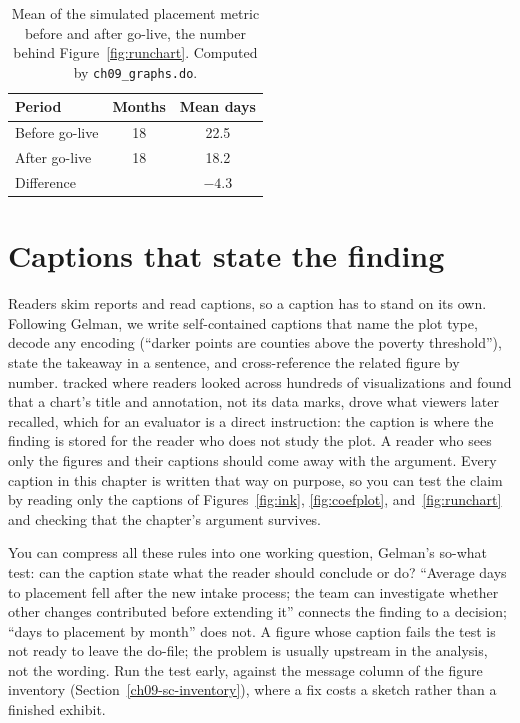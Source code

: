 \documentclass[
    a4paper,
    fontsize=10pt,
    twoside=true,
    numbers=noenddot,
]{kaobook}
\begin{document}
\begin{table}[htbp]
\centering
\caption[Before and after the intervention]{Mean of the simulated placement metric before and after go-live, the number behind Figure~\ref{fig:runchart}. Computed by \texttt{ch09\_graphs.do}.}
\label{tab:runsummary}
\begin{tabular}{lcc}
\hline
Period & Months & Mean days \\
\hline
Before go-live & 18 & 22.5 \\
After go-live  & 18 & 18.2 \\
\hline
Difference     &    & $-4.3$ \\
\hline
\end{tabular}
\end{table}

\section{Captions that state the finding}\label{sec:captions}
Readers skim reports and read captions, so a caption has to stand on its own. Following Gelman, we write self-contained captions that name the plot type, decode any encoding (\enquote{darker points are counties above the poverty threshold}), state the takeaway in a sentence, and cross-reference the related figure by number. \textcite{borkin2016beyond} tracked where readers looked across hundreds of visualizations and found that a chart's title and annotation, not its data marks, drove what viewers later recalled, which for an evaluator is a direct instruction: the caption is where the finding is stored for the reader who does not study the plot. A reader who sees only the figures and their captions should come away with the argument. Every caption in this chapter is written that way on purpose, so you can test the claim by reading only the captions of Figures~\ref{fig:ink}, \ref{fig:coefplot}, and~\ref{fig:runchart} and checking that the chapter's argument survives.

You can compress all these rules into one working question, Gelman's so-what test: can the caption state what the reader should conclude or do? \enquote{Average days to placement fell after the new intake process; the team can investigate whether other changes contributed before extending it} connects the finding to a decision; \enquote{days to placement by month} does not. A figure whose caption fails the test is not ready to leave the do-file; the problem is usually upstream in the analysis, not the wording. Run the test early, against the message column of the figure inventory (Section~\ref{ch09-sc-inventory}), where a fix costs a sketch rather than a finished exhibit.
\end{document}
